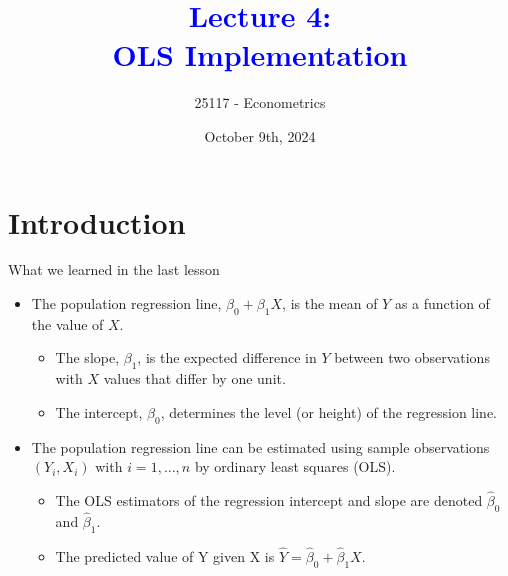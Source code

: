 \documentclass[notes,10pt, aspectratio=169]{beamer}
\title[]{\textcolor{blue}{Lecture 4:\\OLS Implementation}}
\author{25117 - Econometrics}
\institute[shortinst]{Universitat Pompeu Fabra}
\date{October 9th, 2024}
\begin{document}

\begin{frame}[plain]
\maketitle
\end{frame}

\section{Introduction}

\begin{frame}{What we learned in the last lesson}
\begin{itemize}
    \item The population regression line, $\beta_0 + \beta_1 X$, is the mean of $Y$ as a function of the value of $X$.
    \begin{itemize}
        \item The slope, $\beta_1$, is the expected difference in $Y$ between two observations with $X$ values that differ by one unit.
        \item The intercept, $\beta_0$, determines the level (or height) of the regression line.
    \end{itemize}\vspace{1em}
    \item The population regression line can be estimated using sample observations $(Y_i, X_i)$ with $i = 1, \dots, n$ by ordinary least squares (OLS).
    \begin{itemize}
        \item The OLS estimators of the regression intercept and slope are denoted $\hat{\beta}_0$ and $\hat{\beta}_1$.
        \item The predicted value of Y given X is $\hat{Y}=\hat{\beta}_0 + \hat{\beta}_1 X$.
    \end{itemize}\vspace{1em}
\end{itemize}
\end{frame}
\end{document}
